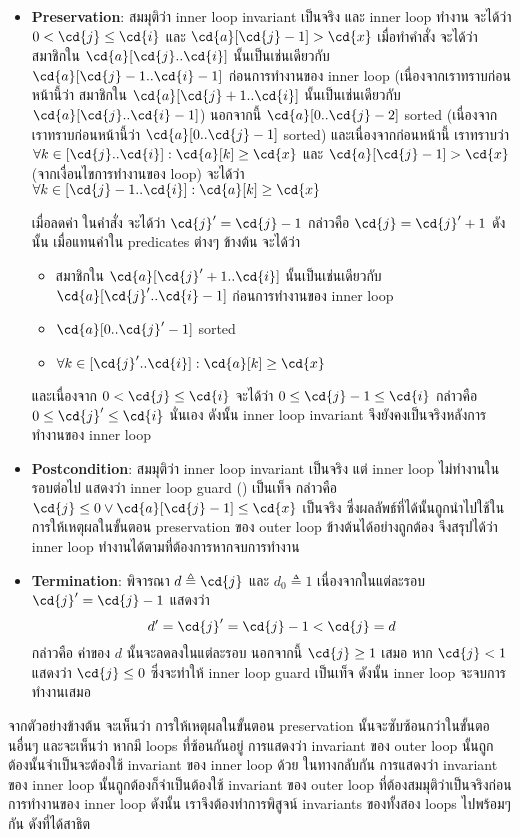 \begin{example}
\begin{itemize}
\item {\bf Preservation}: สมมุติว่า inner loop invariant เป็นจริง และ inner loop ทำงาน จะได้ว่า $0<\cd{j}\leq\cd{i}$ และ $\cd{a}[\cd{j}-1]>\cd{x}$ \enskip เมื่อทำคำสั่ง  จะได้ว่า สมาชิกใน $\cd{a}[\cd{j}..\cd{i}]$ นั้นเป็นเช่นเดียวกับ $\cd{a}[\cd{j}-1..\cd{i}-1]$ ก่อนการทำงานของ inner loop (เนื่องจากเราทราบก่อนหน้านี้ว่า สมาชิกใน $\cd{a}[\cd{j}+1..\cd{i}]$ นั้นเป็นเช่นเดียวกับ $\cd{a}[\cd{j}..\cd{i}-1]$) \enskip นอกจากนี้ $\cd{a}[0..\cd{j}-2]$ sorted (เนื่องจากเราทราบก่อนหน้านี้ว่า $\cd{a}[0..\cd{j}-1]$ sorted) และเนื่องจากก่อนหน้านี้ เราทราบว่า $\forall k\in[\cd{j}..\cd{i}]: \cd{a}[k]\geq\cd{x}$ และ $\cd{a}[\cd{j}-1]>\cd{x}$ (จากเงื่อนไขการทำงานของ loop) จะได้ว่า $\forall k\in[\cd{j}-1..\cd{i}]: \cd{a}[k]\geq\cd{x}$

เมื่อลดค่า  ในคำสั่ง  จะได้ว่า $\cd{j}'=\cd{j}-1$ กล่าวคือ $\cd{j}=\cd{j}'+1$ \enskip ดังนั้น เมื่อแทนค่าใน predicates ต่างๆ ข้างต้น จะได้ว่า
\begin{itemize}
\item สมาชิกใน $\cd{a}[\cd{j}'+1..\cd{i}]$ นั้นเป็นเช่นเดียวกับ $\cd{a}[\cd{j}'..\cd{i}-1]$ ก่อนการทำงานของ inner loop
\item $\cd{a}[0..\cd{j}'-1]$ sorted
\item $\forall k\in[\cd{j}'..\cd{i}]: \cd{a}[k]\geq\cd{x}$
\end{itemize}
และเนื่องจาก $0<\cd{j}\leq\cd{i}$ จะได้ว่า $0\leq\cd{j}-1\leq\cd{i}$ กล่าวคือ $0\leq\cd{j}'\leq\cd{i}$ นั่นเอง \enskip ดังนั้น inner loop invariant จึงยังคงเป็นจริงหลังการทำงานของ inner loop \qquad\yea

\item {\bf Postcondition}: สมมุติว่า inner loop invariant เป็นจริง แต่ inner loop ไม่ทำงานในรอบต่อไป แสดงว่า inner loop guard () เป็นเท็จ กล่าวคือ $\cd{j}\leq 0\vee\cd{a}[\cd{j}-1]\leq\cd{x}$ เป็นจริง ซึ่งผลลัพธ์ที่ได้นั้นถูกนำไปใช้ในการให้เหตุผลในขั้นตอน preservation ของ outer loop ข้างต้นได้อย่างถูกต้อง จึงสรุปได้ว่า inner loop ทำงานได้ตามที่ต้องการหากจบการทำงาน \qquad\yea

\item {\bf Termination}: พิจารณา $d\triangleq\cd{j}$ และ $d_0\triangleq 1$ \enskip เนื่องจากในแต่ละรอบ $\cd{j}'=\cd{j}-1$ แสดงว่า 
\[d'=\cd{j}'=\cd{j}-1<\cd{j}=d\]
กล่าวคือ ค่าของ $d$ นั้นจะลดลงในแต่ละรอบ \enskip นอกจากนี้ $\cd{j}\geq 1$ เสมอ \enskip หาก $\cd{j}<1$ แสดงว่า $\cd{j}\leq 0$ ซึ่งจะทำให้ inner loop guard เป็นเท็จ \enskip ดังนั้น inner loop จะจบการทำงานเสมอ \qquad\yea
\end{itemize}
\end{example}
จากตัวอย่างข้างต้น จะเห็นว่า การให้เหตุผลในขั้นตอน preservation นั้นจะซับซ้อนกว่าในขั้นตอนอื่นๆ และจะเห็นว่า หากมี loops ที่ซ้อนกันอยู่ การแสดงว่า invariant ของ outer loop นั้นถูกต้องนั้นจำเป็นจะต้องใช้ invariant ของ inner loop ด้วย \enskip ในทางกลับกัน การแสดงว่า invariant ของ inner loop นั้นถูกต้องก็จำเป็นต้องใช้ invariant ของ outer loop ที่ต้องสมมุติว่าเป็นจริงก่อนการทำงานของ inner loop \enskip ดังนั้น เราจึงต้องทำการพิสูจน์ invariants ของทั้งสอง loops ไปพร้อมๆ กัน ดังที่ได้สาธิต
